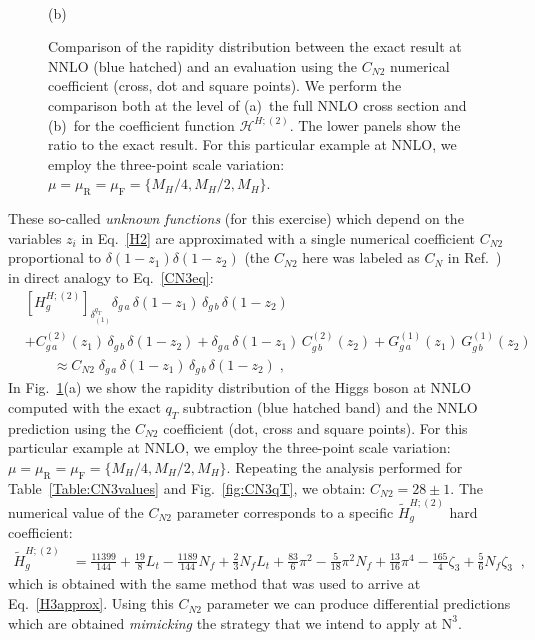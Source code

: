\documentclass[12pt]{article}
\DeclareRobustCommand{\nn}{\nonumber}
\DeclareRobustCommand{\mur}{\ensuremath{\mu_{\mathrm{R}}}\xspace}
\DeclareRobustCommand{\muR}{\mur}
\DeclareRobustCommand{\muf}{\ensuremath{\mu_{\mathrm{F}}}\xspace}
\DeclareRobustCommand{\muF}{\muf}
\DeclareRobustCommand{\qt}{\ensuremath{q_T}\xspace}
\DeclareRobustCommand{\cH}{\ensuremath{\mathcal{H}}}
\DeclareRobustCommand{\LO}{\text{LO}\xspace}
\DeclareRobustCommand{\N}[1]{\ensuremath{\text{N}^{#1}}} %
\begin{document}
\begin{figure}[t]
\begin{minipage}{.48\linewidth}
  \\
  (b)
\end{minipage}
\caption{\label{fig:yHCN}{Comparison of the rapidity distribution between the exact result at NNLO (blue hatched) and an evaluation using the $C_{N2}$ numerical coefficient (cross, dot and square points). 
We perform the comparison both at the level of (a)~the full NNLO cross section and (b)~for the coefficient function $\cH^{H;(2)}$.
The lower panels show the ratio to the exact result. 
For this particular example at NNLO, we employ the three-point scale variation: $\mu=\muR=\muF=\{M_{H}/4,M_{H}/2,M_{H}\}$. 
}}
\end{figure}

These so-called \emph{unknown functions} (for this exercise) which depend on the variables $z_i$ in Eq.~\eqref{H2} are approximated with a single numerical coefficient $C_{N2}$ proportional to $\delta(1-z_1)\delta(1-z_2)$ (the $C_{N2}$ here was labeled as $C_{N}$ in Ref.~\cite{Bozzi:2005wk}) in direct analogy to Eq.~\eqref{CN3eq}:
\begin{align}
  &
  \left[ H_g^{H;(2)} \right]_{\delta^{\qt}_{(1)}} 
  \delta_{g\,a} \, \delta(1-z_1) \, \delta_{g\,b} \, \delta(1-z_2) 
  \nn\\&
  + C^{(2)}_{g\,a}(z_1) \, \delta_{g\,b} \, \delta(1-z_2) 
  + \delta_{g\,a} \, \delta(1-z_1) \, C^{(2)}_{g\,b}(z_2) 
  + G^{(1)}_{g\,a}(z_1) \, G^{(1)}_{g\,b}(z_2) 
  \nn\\&\qquad\approx
  C_{N2} \; \delta_{g\,a} \, \delta(1-z_1) \, \delta_{g\,b} \, \delta(1-z_2) \;,
  \label{CNeq}
\end{align}
In Fig.~\ref{fig:yHCN}(a) we show the rapidity distribution of the Higgs boson at NNLO computed with the exact $\qt$ subtraction (blue hatched band) and the NNLO prediction using the $C_{N2}$ coefficient (dot, cross and square points). For this particular example at NNLO, we employ the three-point scale variation: $\mu=\muR=\muF=\{M_{H}/4,M_{H}/2,M_{H}\}$. Repeating the analysis performed for Table~\ref{Table:CN3values} and Fig.~\ref{fig:CN3qT}, we obtain: $C_{N2}=28\pm 1$. The numerical value of the $C_{N2}$ parameter corresponds to a specific $\widetilde{H}^{H;(2)}_{g}$ hard coefficient:
\begin{align}
\label{Ht2g}
\widetilde{H}^{H;(2)}_{g}&=\frac{11399}{144}+\frac{19}{8} L_{t}-\frac{1189}{144} N_{f}+\frac{2}{3} N_{f} L_{t}+\frac{83}{6} \pi^{2} -\frac{5}{18} \pi^{2} N_{f} + \frac{13}{16} \pi^{4} - \frac{165}{4} \zeta_{3} + \frac{5}{6} N_{f} \zeta_{3}\;\;,
\end{align}
which is obtained with the same method that was used to arrive at Eq.~\eqref{H3approx}.
Using this $C_{N2}$ parameter we can produce differential predictions which are obtained \textit{mimicking} the strategy that we intend to apply at \N3\LO. 
\end{document}
